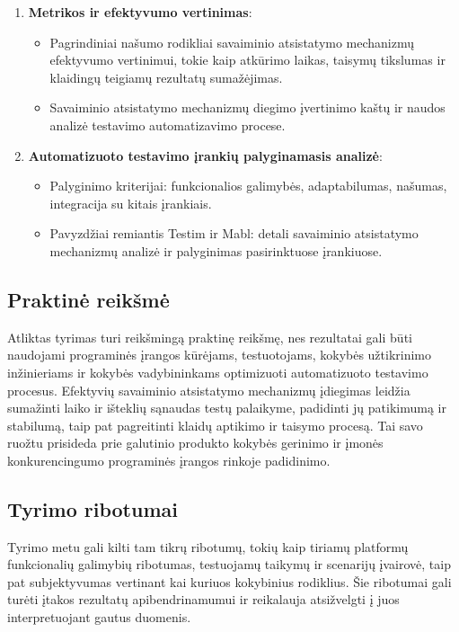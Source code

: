 \documentclass[
]{VUMIFPSkursinis}
\begin{document}
\begin{enumerate}
    \item \textbf{Metrikos ir efektyvumo vertinimas}:
    \begin{itemize}
        \item Pagrindiniai našumo rodikliai savaiminio atsistatymo mechanizmų efektyvumo vertinimui, tokie kaip atkūrimo laikas, taisymų tikslumas ir klaidingų teigiamų rezultatų sumažėjimas.
        \item Savaiminio atsistatymo mechanizmų diegimo įvertinimo kaštų ir naudos analizė testavimo automatizavimo procese.
    \end{itemize}
    
    \item \textbf{Automatizuoto testavimo įrankių palyginamasis analizė}:
    \begin{itemize}
        \item Palyginimo kriterijai: funkcionalios galimybės, adaptabilumas, našumas, integracija su kitais įrankiais.
        \item Pavyzdžiai remiantis Testim ir Mabl: detali savaiminio atsistatymo mechanizmų analizė ir palyginimas pasirinktuose įrankiuose.
    \end{itemize}
\end{enumerate}

\subsection{Praktinė reikšmė}

Atliktas tyrimas turi reikšmingą praktinę reikšmę, nes rezultatai gali būti naudojami programinės įrangos kūrėjams, testuotojams, kokybės užtikrinimo inžinieriams ir kokybės vadybininkams optimizuoti automatizuoto testavimo procesus. Efektyvių savaiminio atsistatymo mechanizmų įdiegimas leidžia sumažinti laiko ir išteklių sąnaudas testų palaikyme, padidinti jų patikimumą ir stabilumą, taip pat pagreitinti klaidų aptikimo ir taisymo procesą. Tai savo ruožtu prisideda prie galutinio produkto kokybės gerinimo ir įmonės konkurencingumo programinės įrangos rinkoje padidinimo.

\subsection{Tyrimo ribotumai}

Tyrimo metu gali kilti tam tikrų ribotumų, tokių kaip tiriamų platformų funkcionalių galimybių ribotumas, testuojamų taikymų ir scenarijų įvairovė, taip pat subjektyvumas vertinant kai kuriuos kokybinius rodiklius. Šie ribotumai gali turėti įtakos rezultatų apibendrinamumui ir reikalauja atsižvelgti į juos interpretuojant gautus duomenis.
\end{document}
